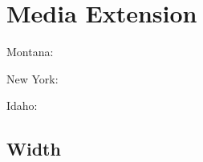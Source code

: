 
\chapter{\label{media-extension}Media Extension}
\par Montana: \href{\#montana-flag}{}
\par New York: \href{\#newyork-flag}{}
\par Idaho: \href{\#idaho-flag}{}
\section{\label{width}Width}